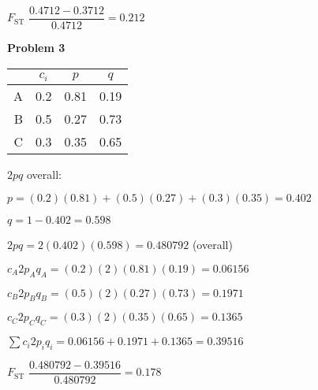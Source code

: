\documentclass[12pt, addpoints, hidelinks]{exam}
\newcommand{\fst}{$F_{\mathrm{ST}}$}
\begin{document}
\begin{questions}
\begin{multicols}{2}
			  \fst{} $\dfrac{0.4712 - 0.3712}{0.4712} = 0.212$ 
\end{multicols}

\vspace{2\baselineskip}

\begin{multicols}{2}
\textbf{Problem 3}

	\begin{tabular}{rccc}
	\toprule
	& $c_i$ & $p$  & $q$ \tabularnewline
	\midrule
	A & 0.2  & 0.81 & 0.19 \tabularnewline
	B & 0.5 & 0.27 & 0.73 \tabularnewline
	C & 0.3  & 0.35 & 0.65 \tabularnewline
	\bottomrule
\end{tabular}

			$2pq$ overall:

$p = (0.2)(0.81) + (0.5)(0.27) + (0.3)(0.35) = 0.402$

$q = 1 - 0.402 = 0.598$

$2pq = 2(0.402)(0.598) = 0.480792$ (overall)

			$c_A2p_Aq_A = (0.2)(2)(0.81)(0.19) = 0.06156$

			$c_B2p_Bq_B = (0.5)(2)(0.27)(0.73) = 0.1971$

			$c_C2p_Cq_C = (0.3)(2)(0.35)(0.65) = 0.1365$

			$\sum c_i 2p_iq_i = 0.06156 + 0.1971 + 0.1365 = 0.39516$
			
			 \fst{} $\dfrac{0.480792 - 0.39516}{0.480792} = 0.178$ 
\end{multicols}


\fi


\end{questions}
\end{document}

